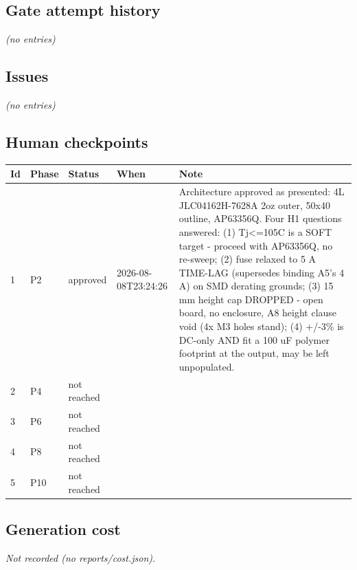 \documentclass[11pt,a4paper]{article}
\begin{document}
\subsection*{Gate attempt history}
\emph{(no entries)}
\subsection*{Issues}
\emph{(no entries)}
\subsection*{Human checkpoints}
{\small
\begin{longtable}{lllp{2.6cm}p{6.4cm}}
\toprule
\textbf{Id} & \textbf{Phase} & \textbf{Status} & \textbf{When} & \textbf{Note} \\
\midrule
\endhead
1 & P2 & approved & 2026-08-08T23:24:26 & Architecture approved as presented: 4L JLC04162H-7628A 2oz outer, 50x40 outline, AP63356Q. Four H1 questions answered: (1) Tj\textless{}=105C is a SOFT target - proceed with AP63356Q, no re-sweep; (2) fuse relaxed to 5 A TIME-LAG (supersedes binding A5's 4 A) on SMD derating grounds; (3) 15 mm height cap DROPPED - open board, no enclosure, A8 height clause void (4x M3 holes stand); (4) +/-3\% is DC-only AND fit a 100 uF polymer footprint at the output, may be left unpopulated. \\
2 & P4 & not reached &  &  \\
3 & P6 & not reached &  &  \\
4 & P8 & not reached &  &  \\
5 & P10 & not reached &  &  \\
\bottomrule
\end{longtable}
}
\subsection*{Generation cost}
\emph{Not recorded (no reports/cost.json).}
\end{document}
